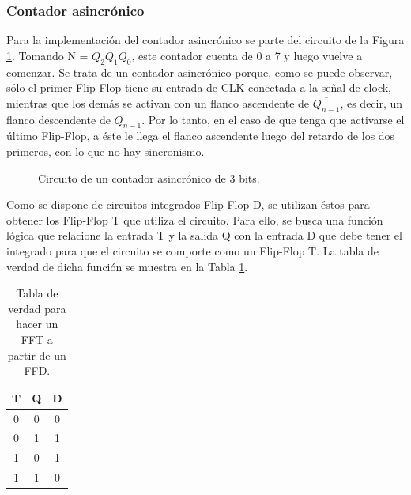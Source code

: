 \documentclass{article}
\begin{document}
\subsubsection{Contador asincr\'onico}
\label{ej7_sec:cont_asinc}
\noindent
Para la implementaci\'on del contador asincr\'onico se parte del circuito de la Figura 	\ref{ej7_fig:asinc_init}. Tomando N = $Q_2 Q_1 Q_0$, este contador cuenta de 0 a 7 y luego vuelve a comenzar. Se trata de un contador asincr\'onico porque, como se puede observar, s\'olo el primer Flip-Flop tiene su entrada de CLK conectada a la señal de clock, mientras que los dem\'as se activan con un flanco ascendente de $\overline{Q_{n-1}}$, es decir, un flanco descendente de $Q_{n-1}$. Por lo tanto, en el caso de que tenga que activarse el \'ultimo Flip-Flop, a \'este le llega el flanco ascendente luego del retardo de los dos primeros, con lo que no hay sincronismo. \\
%
\begin{figure}[H]
	\centering
	\caption{Circuito de un contador asincr\'onico de 3 bits.}
	\label{ej7_fig:asinc_init}
\end{figure}
%
Como se dispone de circuitos integrados Flip-Flop D, se utilizan \'estos para obtener los Flip-Flop T que utiliza el circuito. Para ello, se busca una funci\'on l\'ogica que relacione la entrada T y la salida Q con la entrada D que debe tener el integrado para que el circuito se comporte como un Flip-Flop T. La tabla de verdad de dicha funci\'on se muestra en la Tabla \ref{ej7_tab:FFDaFFT}.
%
\begin{table}[H]
\centering
\begin{tabular}{|c|c|c|}
\hline
\textbf{T} & \textbf{Q} & \textbf{D} \\ \hline
0          & 0          & 0          \\ \hline
0          & 1          & 1          \\ \hline
1          & 0          & 1          \\ \hline
1          & 1          & 0          \\ \hline
\end{tabular}
\caption{Tabla de verdad para hacer un FFT a partir de un FFD.}
\label{ej7_tab:FFDaFFT}
\end{table}
\end{document}
